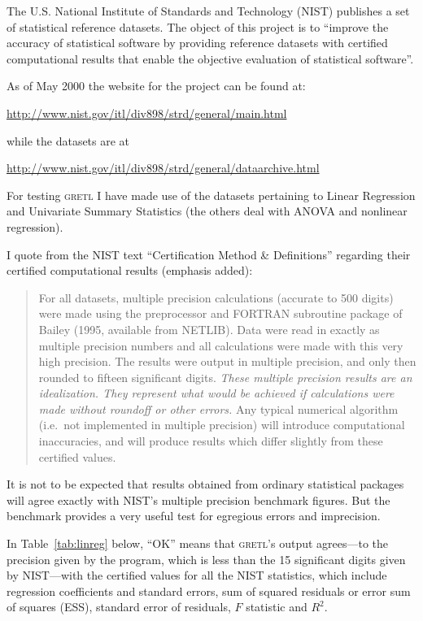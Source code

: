 \documentclass{article}
\begin{document}
The U.S. National Institute of Standards and Technology (NIST)
publishes a set of statistical reference datasets.  The object
of this project is to ``improve the accuracy of statistical software
by providing reference datasets with certified computational results
that enable the objective evaluation of statistical software''.

As of May 2000 the website for the project can be found at:

\url{http://www.nist.gov/itl/div898/strd/general/main.html}

\noindent while the datasets are at

\url{http://www.nist.gov/itl/div898/strd/general/dataarchive.html}

For testing \textsc{gretl} I have made use of the datasets pertaining
to Linear Regression and Univariate Summary Statistics (the others
deal with ANOVA and nonlinear regression).

I quote from the NIST text ``Certification Method \& Definitions''
regarding their certified computational results (emphasis added):

\begin{quote}
  For all datasets, multiple precision calculations (accurate to 500
  digits) were made using the preprocessor and FORTRAN subroutine
  package of Bailey (1995, available from NETLIB). Data were read in
  exactly as multiple precision numbers and all calculations were made
  with this very high precision. The results were output in multiple
  precision, and only then rounded to fifteen significant digits.
  \textit{These multiple precision results are an idealization. They
    represent what would be achieved if calculations were made without
    roundoff or other errors.} Any typical numerical algorithm (i.e.\ 
  not implemented in multiple precision) will introduce computational
  inaccuracies, and will produce results which differ slightly from
  these certified values.
\end{quote}

It is not to be expected that results obtained from ordinary
statistical packages will agree exactly with NIST's multiple precision
benchmark figures.  But the benchmark provides a very useful test for
egregious errors and imprecision.  

In Table~\ref{tab:linreg} below, ``OK'' means that \textsc{gretl}'s
output agrees---to the precision given by the program, which is less
than the 15 significant digits given by NIST---with the certified
values for all the NIST statistics, which include regression
coefficients and standard errors, sum of squared residuals or error
sum of squares (ESS), standard error of residuals, $F$ statistic and
$R^2$.
\end{document}
